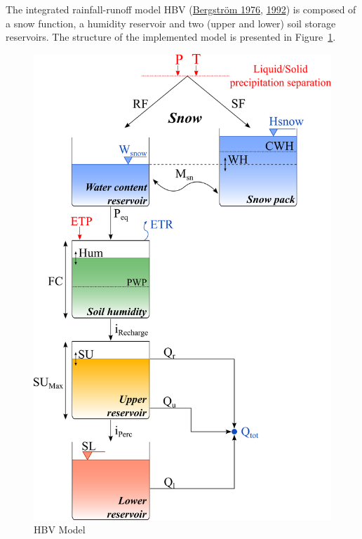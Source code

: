 \documentclass[
  letterpaper,
  DIV=11,
  numbers=noendperiod]{scrreprt}
\begin{document}
The integrated rainfall-runoff model HBV
(\protect\hyperlink{ref-bergstrom_development_1976}{Bergström 1976},
\protect\hyperlink{ref-bergstrom_hbv_1992}{1992}) is composed of a snow
function, a humidity reservoir and two (upper and lower) soil storage
reservoirs. The structure of the implemented model is presented in
Figure~\ref{fig-model_hbv}.

\begin{figure}

{\centering \includegraphics{./figures/fig-model_hbv.png}

}

\caption{\label{fig-model_hbv}HBV Model}

\end{figure}
\end{document}
